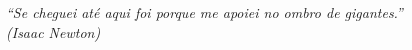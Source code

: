\begin{epigrafe}
    \vspace*{\fill}
    \begin{flushright}

        \textit{“Se cheguei até aqui foi porque me apoiei no ombro de gigantes.”\\
        (Isaac Newton)}
    \end{flushright}
\end{epigrafe}
